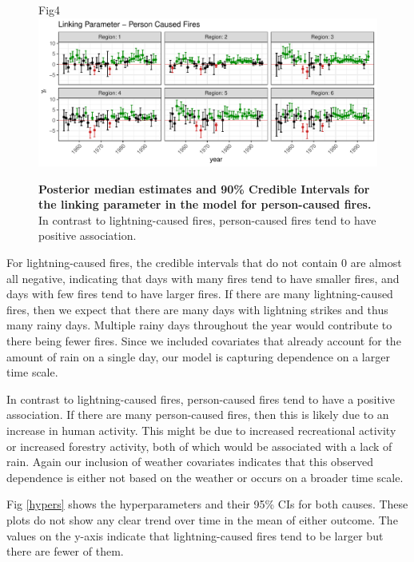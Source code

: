 \documentclass[10pt,letterpaper]{article}
\begin{document}
\begin{figure}[h!]
\centering
Fig4
\includegraphics[width=\textwidth]{Joint_Count_Files/gammaper-1.pdf}
\caption{\label{gammaper}\textbf{Posterior median estimates and 90\% Credible
Intervals for the linking parameter in the model for person-caused
fires.} In contrast to lightning-caused fires, person-caused fires tend
to have positive association.}
\end{figure}

For lightning-caused fires, the credible intervals that do not contain 0
are almost all negative, indicating that days with many fires tend to
have smaller fires, and days with few fires tend to have larger fires.
If there are many lightning-caused fires, then we expect that there are
many days with lightning strikes and thus many rainy days. Multiple
rainy days throughout the year would contribute to there being fewer
fires. Since we included covariates that already account for the amount
of rain on a single day, our model is capturing dependence on a larger
time scale.

In contrast to lightning-caused fires, person-caused fires tend to have
a positive association. If there are many person-caused fires, then this
is likely due to an increase in human activity. This might be due to
increased recreational activity or increased forestry activity, both of
which would be associated with a lack of rain. Again our inclusion of
weather covariates indicates that this observed dependence is either not
based on the weather or occurs on a broader time scale.

Fig \ref{hypers} shows the hyperparameters and their 95\% CIs for both
causes. These plots do not show any clear trend over time in the mean of
either outcome. The values on the y-axis indicate that lightning-caused
fires tend to be larger but there are fewer of them.
\end{document}
